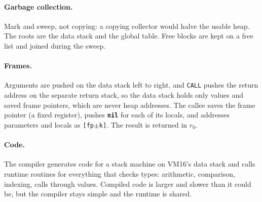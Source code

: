 \documentclass[11pt,a4paper]{article}
\newcommand{\kw}[1]{\textbf{\texttt{#1}}}
\newcommand{\vm}{VM16}
\newcommand{\op}[1]{\texttt{#1}}
\begin{document}
\paragraph{Garbage collection.} Mark and sweep, not copying: a copying
collector would halve the usable heap. The roots are the data stack and the
global table. Free blocks are kept on a free list and joined during the
sweep.

\paragraph{Frames.} Arguments are pushed on the data stack left to right,
and \op{CALL} pushes the return address on the separate return stack, so the
data stack holds only values and saved frame pointers, which are never heap
addresses. The callee saves the frame pointer (a fixed register), pushes
\kw{nil} for each of its locals, and addresses parameters and locals as
\texttt{[fp$\pm$k]}. The result is returned in $r_0$.

\paragraph{Code.} The compiler generates code for a stack machine on
\vm{}'s data stack and calls runtime routines for everything that checks
types: arithmetic, comparison, indexing, calls through values. Compiled code
is larger and slower than it could be, but the compiler stays simple and the
runtime is shared.
\end{document}
